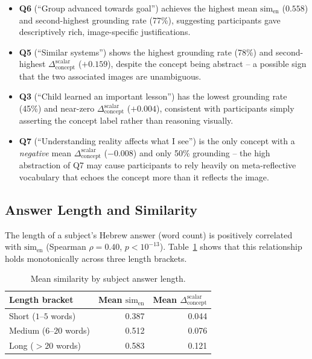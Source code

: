 \documentclass[12pt,a4paper]{article}
\newcommand{\simEN}{\ensuremath{\mathrm{sim}_{\text{en}}}}
\newcommand{\SACs}{\ensuremath{\Delta_{\text{concept}}^{\text{scalar}}}}
\begin{document}
\begin{itemize}
  \item \textbf{Q6} (``Group advanced towards goal'') achieves the highest mean \simEN{}
        ($0.558$) and second-highest grounding rate (77\%), suggesting participants
        gave descriptively rich, image-specific justifications.
  \item \textbf{Q5} (``Similar systems'') shows the highest grounding rate (78\%) and
        second-highest \SACs{} ($+0.159$), despite the concept being abstract -- a
        possible sign that the two associated images are unambiguous.
  \item \textbf{Q3} (``Child learned an important lesson'') has the lowest grounding
        rate (45\%) and near-zero \SACs{} ($+0.004$), consistent with participants
        simply asserting the concept label rather than reasoning visually.
  \item \textbf{Q7} (``Understanding reality affects what I see'') is the only concept
        with a \emph{negative} mean \SACs{} ($-0.008$) and only 50\% grounding -- the
        high abstraction of Q7 may cause participants to rely heavily on meta-reflective
        vocabulary that echoes the concept more than it reflects the image.
\end{itemize}

\subsection{Answer Length and Similarity}

The length of a subject's Hebrew answer (word count) is positively correlated with
\simEN{} (Spearman $\rho = 0.40$, $p < 10^{-13}$).  Table~\ref{tab:length_brackets}
shows that this relationship holds monotonically across three length brackets.

\begin{table}[H]
\centering
\caption{Mean similarity by subject answer length.}
\label{tab:length_brackets}
\small
\begin{tabular}{lrr}
\toprule
\textbf{Length bracket} & \textbf{Mean \simEN{}} & \textbf{Mean \SACs{}} \\
\midrule
Short ($1$--$5$ words)  & 0.387 & 0.044 \\
Medium ($6$--$20$ words)& 0.512 & 0.076 \\
Long ($>20$ words)      & 0.583 & 0.121 \\
\bottomrule
\end{tabular}
\end{table}
\end{document}
